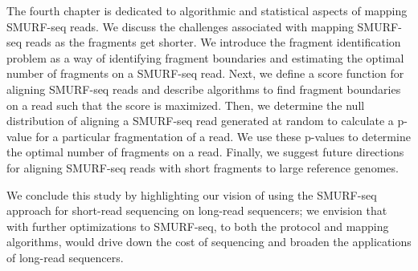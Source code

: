 The fourth chapter is dedicated to algorithmic and statistical aspects
of mapping SMURF-seq reads. We discuss the challenges associated with
mapping SMURF-seq reads as the fragments get shorter.
%
We introduce the fragment identification problem as a way of identifying
fragment boundaries and estimating the optimal number of fragments on a
SMURF-seq read.
%
Next, we define a score function for aligning SMURF-seq reads and
describe algorithms to find fragment boundaries on a read such that the
score is maximized.
%
Then, we determine the null distribution of aligning a SMURF-seq read
generated at random to calculate a p-value for a particular
fragmentation of a read. We use these p-values to determine the optimal
number of fragments on a read.
%
Finally, we suggest future directions for aligning SMURF-seq reads with
short fragments to large reference genomes.

We conclude this study by highlighting our vision of using the SMURF-seq
approach for short-read sequencing on long-read sequencers; we envision
that with further optimizations to SMURF-seq, to both the protocol and
mapping algorithms, would drive down the cost of sequencing and broaden
the applications of long-read sequencers.
